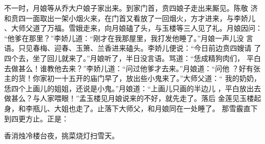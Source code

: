 不一时，月娘等从乔大户娘子家出来。到家门首，贲四娘子走出来厮见。陈敬
济和贲四一面取出一架小烟火来，在门首又看放了一回烟火，方才进来，与李娇儿
、大师父道了万福。雪娥走来，向月娘磕了头，与玉楼等三人见了礼。月娘因问：
“他爹在那里？”李娇儿道：“刚才在我那屋里，我打发他睡了。”月娘一声儿没
言语。只见春梅、迎春、玉箫、兰香进来磕头。李娇儿便说：“今日前边贲四嫂请
了四个去，坐了回儿就来了。”月娘听了，半日没言语。骂道：“恁成精狗肉们，
平白去做甚么！谁教他去来？”李娇儿道：“问过他爹才去来。”月娘道：“问他
？好有张主的货！你家初一十五开的庙门早了，放出些小鬼来了。”大师父道：“
我的奶奶，恁四个上画儿的姐姐，还说是小鬼。”月娘道：“上画儿只画的半边儿
，平白放出去做甚么？与人家喂眼！”孟玉楼见月娘说来的不好，就先走了。落后
金莲见玉楼起身，和李瓶儿、大姐也走了。止落下大师父，和月娘同在一处睡了。
那雪霰直下到四更方止。正是：

香消烛冷楼台夜，挑菜烧灯扫雪天。

